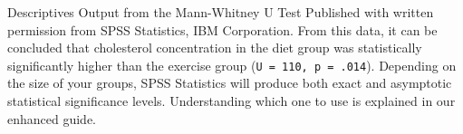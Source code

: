 \documentclass[]{article}
\begin{document}
Descriptives Output from the Mann-Whitney U Test
Published with written permission from SPSS Statistics, IBM Corporation.
From this data, it can be concluded that cholesterol concentration in the diet group was statistically significantly higher than the exercise group (\texttt{U = 110, p = .014}). Depending on the size of your groups, SPSS Statistics will produce both exact and asymptotic statistical significance levels. Understanding which one to use is explained in our enhanced guide.

\end{document}
